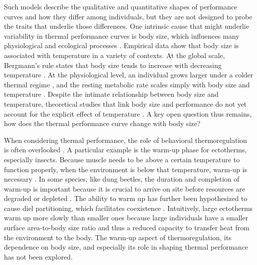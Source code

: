 Such models describe the qualitative and quantitative shapes of performance curves and how they differ among individuals, but they are not designed to probe the traits that underlie those differences.
One intrinsic cause that might underlie variability in thermal performance curves is body size, which influences many physiological and ecological processes \citep{Calder1984,Schmidt1984,Peters1986}.
Empirical data show that body size is associated with temperature in a variety of contexts.
At the global scale, Bergmann's rule states that body size tends to increase with decreasing temperature \citep{Bergmann1847, Blackburn1999}.
At the physiological level, an individual grows larger under a colder thermal regime \citep{VanVoorhies1996}, and the resting metabolic rate scales simply with body size and temperature \citep{Kleiber1947, Peters1986, Gillooly2001, Brown2004}.
Despite the intimate relationship between body size and temperature, theoretical studies that link body size and performance do not yet account for the explicit effect of temperature \citep[e.g.,][]{Yodzis1992, Brown1993}.
A key open question thus remains, how does the thermal performance curve change with body size?

When considering thermal performance, the role of behavioral thermoregulation is often overlooked \citep{Kearney2009b}.
A particular example is the warm-up phase for ectotherms, especially insects.
Because muscle needs to be above a certain temperature to function properly, when the environment is below that temperature, warm-up is necessary \citep[e.g.,][]{Heinrich1975}.
In some species, like dung beetles, the duration and completion of warm-up is important because it is crucial to arrive on site before resources are degraded or depleted \citep{Hanski1991}. %
The ability to warm up has further been hypothesized to cause diel partitioning, which facilitates coexistence \citep{Viljanen2009}.
Intuitively, large ectotherms warm up more slowly than smaller ones because large individuals have a smaller surface area-to-body size ratio and thus a reduced capacity to transfer heat from the environment to the body.
The warm-up aspect of thermoregulation, its dependence on body size, and especially its role in shaping thermal performance has not been explored.

